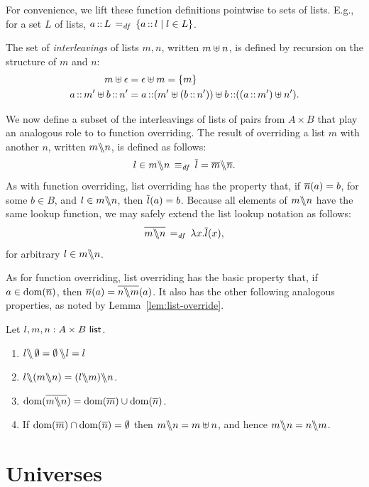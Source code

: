\documentclass[11pt]{report}
\begin{document}
For convenience, we lift these function definitions pointwise to sets of lists. E.g., for a set $L$ of lists, $a \lcons L \eqdef \setof{a \lcons l}{l \in L}$. 

The set of \emph{interleavings} of lists $m,n$, written $m \merge n$, is defined by recursion on the structure of $m$ and $n$: \begin{align*}
	m \merge \lnil & = \lnil \merge m = \set{m} \\ 
	a \lcons m' \merge b \lcons n' & = a \lcons (m' \merge (b\lcons n')) \uplus b \lcons ((a \lcons m') \merge n').
\end{align*}

We now define a subset of the interleavings of lists of pairs from $A \times B$ that play an analogous role to to function overriding. The result of overriding a list $m$ with another $n$, written $m \override n$, is defined as follows: \[ l \in m \override n \iffdef \funof{l} = \funof{m} \override \funof{n}.\] As with function overriding, list overriding has the property that, if $\funof{n}(a) = b$, for some $b \in B$, and $l \in m \override n$, then $\funof{l}(a) = b$. Because all elements of $m \override n$ have the same lookup function, we may safely extend the list lookup notation as follows: \[ \funof{m \override n} \eqdef \lambda x . \funof{l}(x),\] for arbitrary $l \in m \override n$. 

As for function overriding, list overriding has the basic property that, if $a \in \dom{\funof{n}}$, then $\funof{n}(a) = \funof{n \override m}(a)$. It also has the other following analogous properties, as noted by Lemma~\ref{lem:list-override}. 
\begin{lemma}
    \label{lem:list-override}
    Let $l,m,n : \listof{A \times B}$. 
    \begin{enumerate}
        \item $l \override \nil = \nil \override l = l$
        \item $l \override (m \override n) = (l \override m) \override n$. 
        \item $\dom{\funof{m \override n}} = \dom{\funof{m}} \cup \dom{\funof{n}}$. 
        \item If $\dom{\funof{m}} \cap \dom{\funof{n}} = \nil$ then $m \override n = m \merge n$, and hence $m \override n = n \override m$. 
    \end{enumerate}
\end{lemma}

\section{Universes}
\end{document}
